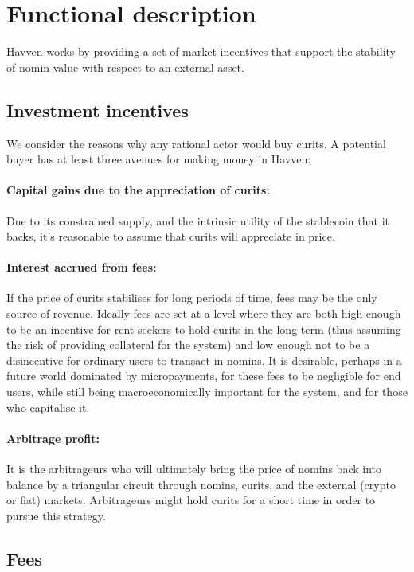 \section{Functional description}

Havven works by providing a set of market incentives that support the stability of nomin value with respect to an external asset.

\subsection{Investment incentives}

We consider the reasons why any rational actor would buy curits. A potential buyer has at least three avenues for making money in Havven:

\paragraph{Capital gains due to the appreciation of curits:}
Due to its constrained supply, and the intrinsic utility of the stablecoin that it backs, it's reasonable to assume that
curits will appreciate in price.

\paragraph{Interest accrued from fees:}
If the price of curits stabilises for long periods of time, fees may be the only source of revenue. Ideally fees are set at a level where they are both high enough to be an incentive for rent-seekers to hold curits in the long term (thus assuming the risk of providing collateral for the system) and low enough not to be a disincentive for ordinary users to transact in nomins.
It is desirable, perhaps in a future world dominated by micropayments, for these fees to be negligible for end users, while still being macroeconomically important for the system, and for those who capitalise it.

\paragraph{Arbitrage profit:}
It is the arbitrageurs who will ultimately bring the price of nomins back into balance by a triangular circuit through nomins, curits, and the external (crypto or fiat) markets. Arbitrageurs might hold curits for a short time in order to pursue this strategy.


\pagebreak
\subsection{Fees}

